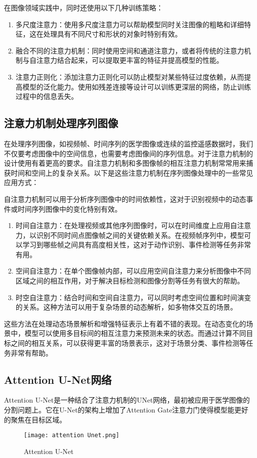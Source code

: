 在图像领域实践中，同时还使用以下几种训练策略：
\begin{enumerate}    
  \item 多尺度注意力：使用多尺度注意力可以帮助模型同时关注图像的粗略和详细特征，这在处理具有不同尺寸和形状的对象时特别有效。
  \item 融合不同的注意力机制：同时使用空间和通道注意力，或者将传统的注意力机制与自注意力结合起来，可以提取更丰富的特征并提高模型的性能。
  \item 注意力正则化：添加注意力正则化可以防止模型对某些特征过度依赖，从而提高模型的泛化能力。使用如残差连接等设计可以训练更深层的网络，防止训练过程中的信息丢失。
\end{enumerate}

\subsection{注意力机制处理序列图像}
在处理序列图像，如视频帧、时间序列的医学图像或连续的监控遥感数据时，我们不仅要考虑图像中的空间信息，也需要考虑图像间的序列信息。对于注意力机制的设计使用有着更高的要求。自注意力机制和多图像帧的相互注意力机制常常用来捕获时间和空间上的复杂关系。以下是这些注意力机制在序列图像处理中的一些常见应用方式：

自注意力机制可以用于分析序列图像中的时间依赖性，这对于识别视频中的动态事件或时间序列图像中的变化特别有效。
\begin{enumerate}    
  \item 时间自注意力：在处理视频或其他序列图像时，可以在时间维度上应用自注意力，以识别不同时间点图像帧之间的关键依赖关系。在视频帧序列中，模型可以学习到哪些帧之间具有高度相关性，这对于动作识别、事件检测等任务非常有用。
  \item 空间自注意力：在单个图像帧内部，可以应用空间自注意力来分析图像中不同区域之间的相互作用，对于解决目标检测和图像分割等任务有很大的帮助。
  \item 时空自注意力：结合时间和空间自注意力，可以同时考虑空间位置和时间演变的关系。这种方法可以用于复杂场景的动态解析，如多物体交互的场景。
\end{enumerate}

这些方法在处理动态场景解析和增强特征表示上有着不错的表现。在动态变化的场景中，模型可以使用多目标间的相互注意力来预测未来的状态。而通过计算不同目标之间的相互关系，可以获得更丰富的场景表示，这对于场景分类、事件检测等任务非常有帮助。


\subsection{Attention U-Net网络}
Attention U-Net\cite{oktay2018attention}是一种结合了注意力机制的UNet网络，最初被应用于医学图像的分割问题上。它在U-Net的架构上增加了Attention Gate注意力门使得模型能更好的聚焦在目标区域。
\begin{figure}[h]
  \centering
  \texttt{[image: attention Unet.png]}
  \caption{Attention U-Net}
  \label{fig:attentionunet}
\end{figure}

